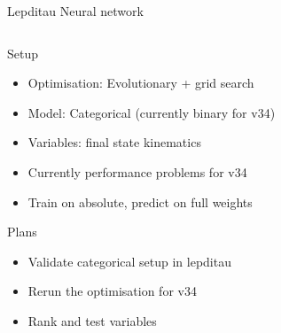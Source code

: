 \begin{frame}{Lepditau Neural network}
\begin{columns}
\begin{column}{0.5\textwidth}
            \begin{block}{Setup}
                \begin{itemize}
                    \item Optimisation: Evolutionary + grid search
                    \item Model: Categorical (currently binary for v34)
                    \item Variables: final state kinematics
                    \item Currently performance problems for v34
                    \item Train on absolute, predict on full weights
                \end{itemize}
            \end{block}
            \vspace{-0.45cm}
            \begin{block}{Plans}
                \begin{itemize}
                    \item Validate categorical setup in lepditau
                    \item Rerun the optimisation for v34
                    \item Rank and test variables
                \end{itemize} 
             \end{block}
        \end{column}
    \end{columns}
\end{frame}

